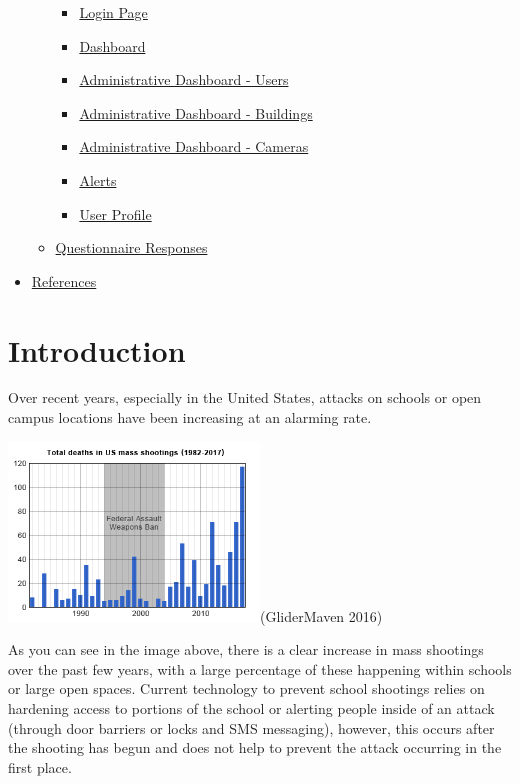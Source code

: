 \documentclass[
  english,
  a4paper,
,tablecaptionabove
]{scrartcl}
\providecommand{\tightlist}{%
  \setlength{\itemsep}{0pt}\setlength{\parskip}{0pt}}
\begin{document}
\begin{itemize}
\begin{itemize}
    \begin{itemize}
    \tightlist
    \item
      \protect\hyperlink{login-page}{Login Page}
    \item
      \protect\hyperlink{dashboard-1}{Dashboard}
    \item
      \protect\hyperlink{administrative-dashboard---users}{Administrative
      Dashboard - Users}
    \item
      \protect\hyperlink{administrative-dashboard---buildings}{Administrative
      Dashboard - Buildings}
    \item
      \protect\hyperlink{administrative-dashboard---cameras}{Administrative
      Dashboard - Cameras}
    \item
      \protect\hyperlink{alerts}{Alerts}
    \item
      \protect\hyperlink{user-profile-1}{User Profile}
    \end{itemize}
  \item
    \protect\hyperlink{questionnaire-responses}{Questionnaire Responses}
  \end{itemize}
\item
  \protect\hyperlink{references}{References}
\end{itemize}

\newpage

\hypertarget{introduction}{%
\section{Introduction}\label{introduction}}

Over recent years, especially in the United States, attacks on schools
or open campus locations have been increasing at an alarming rate.

\includegraphics[width=0.5\textwidth,height=\textheight]{images/ppm-images/shootings.png}(GliderMaven
2016)

As you can see in the image above, there is a clear increase in mass
shootings over the past few years, with a large percentage of these
happening within schools or large open spaces. Current technology to
prevent school shootings relies on hardening access to portions of the
school or alerting people inside of an attack (through door barriers or
locks and SMS messaging), however, this occurs after the shooting has
begun and does not help to prevent the attack occurring in the first
place.
\end{document}
